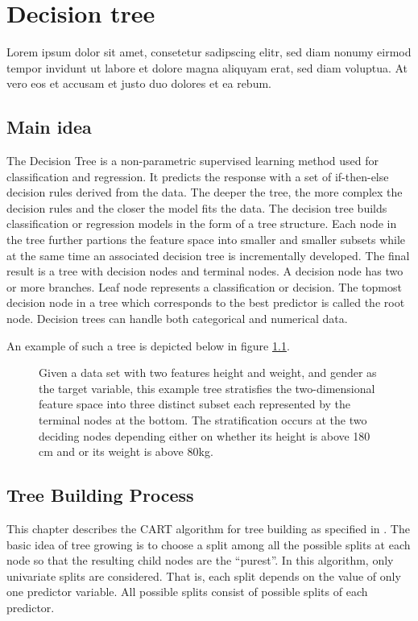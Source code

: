 \chapter{Decision tree}
Lorem ipsum dolor sit amet, consetetur sadipscing elitr, sed diam nonumy eirmod tempor invidunt ut labore
et dolore magna aliquyam erat, sed diam voluptua. At vero eos et accusam et justo duo dolores et ea rebum.

\section{Main idea}
The Decision Tree is a non-parametric supervised learning method used for classification and regression.
It predicts the response with a set of if-then-else decision rules derived from the data.
The deeper the tree, the more complex the decision rules and the closer the model fits the data.
The decision tree builds classification or regression models in the form of a tree structure. 
Each node in the tree further partions the feature space into smaller and smaller subsets 
while at the same time an associated decision tree is incrementally developed.
The final result is a tree with decision nodes and terminal nodes. 
A decision node has two or more branches.
Leaf node represents a classification or decision. 
The topmost decision node in a tree which corresponds to the best predictor is called the root node.
Decision trees can handle both categorical and numerical data.

An example of such a tree is depicted below in figure \ref{Fig:decision_tree_example}.

\begin{figure}[H]
    \captionsetup{format=plain}
    \caption{Given a data set with two features height and weight, and gender as the target variable, 
             this example tree stratisfies the two-dimensional feature space into three distinct subset each 
             represented by the terminal nodes at the bottom.
             The stratification occurs at the two deciding nodes depending either on whether its height is above 180 cm 
             and or its weight  is above 80kg.
             }
    \label{Fig:decision_tree_example}
\end{figure}

\section{Tree Building Process}
This chapter describes the CART algorithm for tree building as specified in \cite{breiman1984classification}.
The basic idea of tree growing is to choose a split among all the possible splits at each node
so that the resulting child nodes are the “purest”. In this algorithm, only univariate splits are
considered. That is, each split depends on the value of only one predictor variable. All
possible splits consist of possible splits of each predictor.

